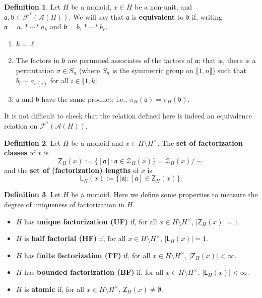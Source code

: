 \documentclass{report}
\newcommand{\A}{\mathcal{A}}
\renewcommand{\aa}{\mathfrak{a}}
\newcommand{\bb}{\mathfrak{b}}
\newcommand{\F}{\mathcal{F}}
\newcommand{\Z}{\mathcal{Z}}
\newcommand{\llb}{\llbracket}
\newcommand{\rrb}{\rrbracket}
\renewcommand{\:}{\text{:}}
\theoremstyle{definition}
\newtheorem{defn}{Definition}[section]
\begin{document}
\begin{defn}
Let $H$ be a monoid, $x\in H$ be a non-unit, and $\aa,\bb \in \F^*(\A(H))$.
We will say that $\aa$ is \textbf{equivalent} to $\bb$ if, writing $\aa = a_1*\cdots * a_k$ and $\bb = b_1*\cdots * b_\ell$,
\begin{enumerate}
\item $k = \ell$.
\item The factors in $\bb$ are permuted associates of the factors of $\aa$; that is, there is a permutation $\sigma\in S_n$ (where $S_n$ is the symmetric group on $\llb 1,n \rrb$) such that $b_i \sim a_{\sigma(i)}$ for all $i\in \llb 1,k \rrb$.
\item $\aa$ and $\bb$ have the same product; i.e., $\pi_H(\aa) = \pi_H(\bb)$.
\end{enumerate}
\end{defn}

It is not difficult to check that the relation defined here is indeed an equivalence relation on $\F^*(\A(H))$.

\begin{defn}
Let $H$ be a monoid and $x\in H\setminus H^\times$.
The \textbf{set of factorization classes} of $x$ is
\[ \mathsf{Z}_H(x) := \{ [\aa]: \aa\in \Z_H(x) \} = \Z_H(x)/\sim \]
and the \textbf{set of (factorization) lengths} of $x$ is
\[ \mathsf{L}_H(x) := \{ |\aa| : [\aa] \in \mathsf{Z}_H(x) \}. \]
\end{defn}

\begin{defn}
Let $H$ be a monoid.
Here we define some properties to measure the degree of uniqueness of factorization in $H$.
\begin{itemize}
\item $H$ has \textbf{unique factorization (UF)} if, for all $x\in H\setminus H^\times$, $|\mathsf{Z}_H(x)| = 1$.
\item $H$ is \textbf{half factorial (HF)} if, for all $x\in H\setminus H^\times$, $|\mathsf{L}_H(x)| = 1$.
\item $H$ has \textbf{finite factorization (FF)} if, for all $x\in H\setminus H^\times$, $|\mathsf{Z}_H(x)| <\infty$.
\item $H$ has \textbf{bounded factorization (BF)} if, for all $x\in H\setminus H^\times$, $|\mathsf{L}_H(x)| < \infty$.
\item $H$ is \textbf{atomic} if, for all $x\in H\setminus H^\times$, $\mathsf{Z}_H(x) \neq \emptyset$.
\end{itemize}
\end{defn}
\end{document}
